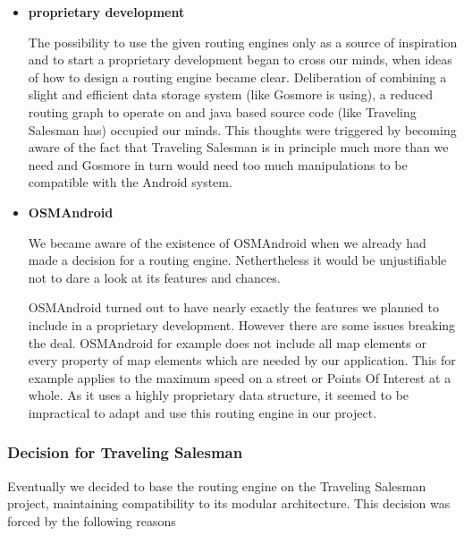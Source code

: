 \begin{itemize}
\begin{itemize}
		\end{itemize}

	\item \textbf{proprietary development}

		The possibility to use the given routing engines only as a source of inspiration and to start a proprietary development began to cross our minds, when ideas of how to design a routing engine became clear. Deliberation of combining a slight and efficient data storage system (like Gosmore is using), a reduced routing graph to operate on and java based source code (like Traveling Salesman has) occupied our minds. This thoughts were triggered by becoming aware of the fact that Traveling Salesman is in principle much more than we need and Gosmore in turn would need too much manipulations to be compatible with the Android system.

	\item \textbf{OSMAndroid}

		We became aware of the existence of OSMAndroid when we already had made a decision for a routing engine. Nethertheless it would be unjustifiable not to dare a look at its features and chances.\newline
		
		OSMAndroid turned out to have nearly exactly the features we planned to include in a proprietary development. However there are some issues breaking the deal. OSMAndroid for example does not include all map elements or every property of map elements which are needed by our application. This for example applies to the maximum speed on a street or Points Of Interest at a whole. As it uses a highly proprietary data structure, it seemed to be impractical to adapt and use this routing engine in our project.

\end{itemize}

\subsubsection{Decision for Traveling Salesman}

Eventually we decided to base the routing engine on the Traveling Salesman project, maintaining compatibility to its modular architecture. This decision was forced by the following reasons


